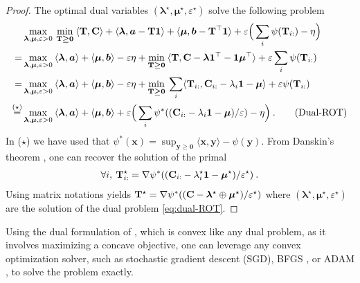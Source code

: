 \begin{proof}

The optimal dual variables $(\bm{\lambda}^\star, \bm{\mu}^\star, \varepsilon^\star)$ solve the following problem 
\begin{align}
    &\max_{\bm{\lambda}, \bm{\mu}, \varepsilon > 0} \: \min_{{\mathbf{T}} \bm{\geq} \bm{0}} \: \langle {\mathbf{T}}, {\mathbf{C}} \rangle + \langle \bm{\lambda}, \bm{a} - {\mathbf{T}} \bm{1} \rangle + \langle \bm{\mu}, \bm{b} - {\mathbf{T}}^\top \bm{1} \rangle + \varepsilon \Big(\sum_i \psi({\mathbf{T}}_{i:}) - \eta \Big) \\
    = &\max_{\bm{\lambda}, \bm{\mu}, \varepsilon> 0} \: \langle \bm{\lambda}, \bm{a} \rangle + \langle \bm{\mu}, \bm{b} \rangle - \varepsilon \eta + \min_{{\mathbf{T}} \bm{\geq} \bm{0}} \: \langle {\mathbf{T}}, {\mathbf{C}} - \bm{\lambda}\bm{1}^\top - \bm{1}\bm{\mu}^\top \rangle + \varepsilon \sum_i \psi({\mathbf{T}}_{i:}) \\
    = &\max_{\bm{\lambda}, \bm{\mu}, \varepsilon>0} \: \langle \bm{\lambda}, \bm{a} \rangle + \langle \bm{\mu}, \bm{b} \rangle - \varepsilon \eta + \min_{{\mathbf{T}} \bm{\geq} \bm{0}} \: \sum_i \langle {\mathbf{T}}_{i:}, {\mathbf{C}}_{i:} - \lambda_i \bm{1} - \bm{\mu} \rangle + \varepsilon \psi({\mathbf{T}}_{i:}) \\
    \stackrel{(\star)}{=} &\max_{\bm{\lambda}, \bm{\mu}, \varepsilon>0}  \: \langle \bm{\lambda}, \bm{a} \rangle + \langle \bm{\mu}, \bm{b} \rangle + \varepsilon \Big(\sum_i \psi^*(({\mathbf{C}}_{i:} - \lambda_i \bm{1} - \bm{\mu}) / \varepsilon) - \eta \Big) \:.
    \tag{Dual-ROT}
    \label{eq:dual-ROT}
\end{align}
In ($\star$) we have used that $\psi^*(\bm{x}) = \sup_{\bm{y} \bm{\geq} \bm{0}} \langle \bm{x}, \bm{y} \rangle - \psi(\bm{y})$.
From Danskin's theorem \citep{danskin1966theory}, one can recover the solution of the primal
\begin{align}
    \forall i, \: {\mathbf{T}}^\star_{i:} = \nabla \psi^*(({\mathbf{C}}_{i:} - \lambda^\star_i \bm{1} - \bm{\mu}^\star) / \varepsilon^\star) \:.
\end{align}
Using matrix notations yields ${\mathbf{T}}^\star = \nabla \psi^*(({\mathbf{C}} - \bm{\lambda}^\star \oplus \bm{\mu}^\star) / \varepsilon^\star)$
where $(\bm{\lambda}^\star, \bm{\mu}^\star, \varepsilon^\star)$ are the solution of the dual problem \eqref{eq:dual-ROT}.

\end{proof}

Using the dual formulation of , which is convex like any dual problem, as it involves maximizing a concave objective, one can leverage any convex optimization solver, such as stochastic gradient descent (SGD), BFGS \citep{liu1989limited}, or ADAM \citep{kingma2014adam}, to solve the problem exactly.

